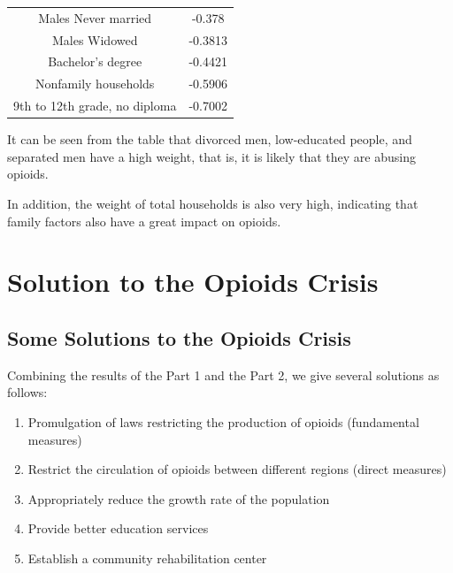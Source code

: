 \documentclass[12pt]{mcmthesis}
\begin{document}
\begin{table}
\begin{tabular}{|c|c|}
Males Never married                                                                     & -0.378  \\
Males Widowed                                                                           & -0.3813 \\
Bachelor's degree                                                                       & -0.4421 \\
Nonfamily households                                                                    & -0.5906 \\
9th to 12th grade, no diploma                                                           & -0.7002\\     \hline
   \end{tabular}
\end{table}\par
It can be seen from the table that divorced men, low-educated people, and separated men have a high weight, that is, it is likely that they are abusing opioids.\par
In addition, the weight of total  households is also very high, indicating that family factors also have a great impact on opioids.
\section{Solution to the Opioids Crisis}
\subsection{Some Solutions to the Opioids Crisis}
Combining the results of the Part 1 and the Part 2, we give several solutions as follows:
\begin{enumerate}
  \item Promulgation of laws restricting the production of opioids (fundamental measures)
  \item Restrict the circulation of opioids between different regions (direct measures)
  \item Appropriately reduce the growth rate of the population
  \item Provide better education services
  \item Establish a community rehabilitation center
\end{enumerate}
\end{document}
